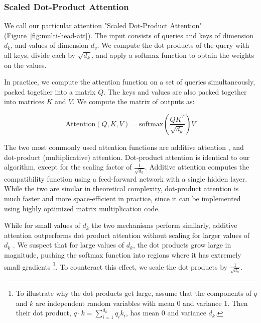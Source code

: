 \documentclass{article}
\begin{document}
\subsubsection{Scaled Dot-Product Attention} \label{sec:scaled-dot-prod}



We call our particular attention "Scaled Dot-Product Attention" (Figure~\ref{fig:multi-head-att}).   The input consists of queries and keys of dimension $d_k$, and values of dimension $d_v$.  We compute the dot products of the query with all keys, divide each by $\sqrt{d_k}$, and apply a softmax function to obtain the weights on the values.

In practice, we compute the attention function on a set of queries simultaneously, packed together into a matrix $Q$.   The keys and values are also packed together into matrices $K$ and $V$.  We compute the matrix of outputs as:

\begin{equation}
   \mathrm{Attention}(Q, K, V) = \mathrm{softmax}(\frac{QK^T}{\sqrt{d_k}})V
\end{equation}

The two most commonly used attention functions are additive attention \citep{bahdanau2014neural}, and dot-product (multiplicative) attention.  Dot-product attention is identical to our algorithm, except for the scaling factor of $\frac{1}{\sqrt{d_k}}$. Additive attention computes the compatibility function using a feed-forward network with a single hidden layer.  While the two are similar in theoretical complexity, dot-product attention is much faster and more space-efficient in practice, since it can be implemented using highly optimized matrix multiplication code. 







While for small values of $d_k$ the two mechanisms perform similarly, additive attention outperforms dot product attention without scaling for larger values of $d_k$ \citep{DBLP:journals/corr/BritzGLL17}. We suspect that for large values of $d_k$, the dot products grow large in magnitude, pushing the softmax function into regions where it has extremely small gradients  \footnote{To illustrate why the dot products get large, assume that the components of $q$ and $k$ are independent random variables with mean $0$ and variance $1$.  Then their dot product, $q \cdot k = \sum_{i=1}^{d_k} q_ik_i$, has mean $0$ and variance $d_k$.}. To counteract this effect, we scale the dot products by $\frac{1}{\sqrt{d_k}}$.
\end{document}
